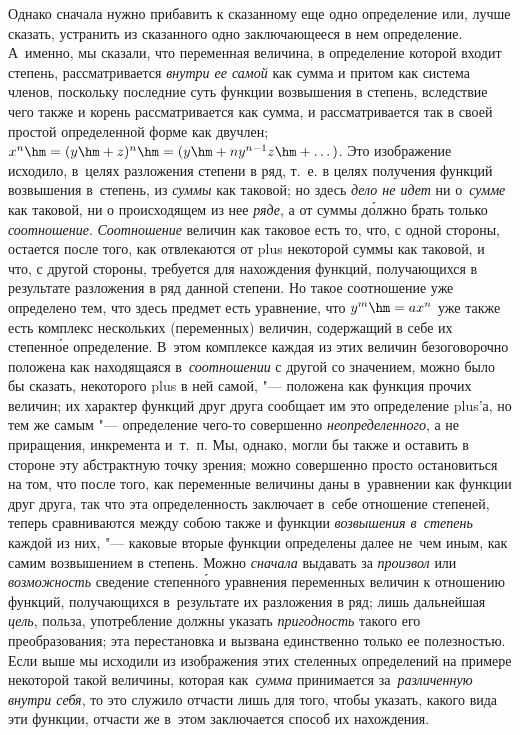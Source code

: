 Однако сначала нужно прибавить к сказанному еще одно определение или, лучше
сказать, устранить из сказанного одно заключающееся в нем определение.
А~именно, мы сказали, что переменная величина, в определение которой входит
степень, рассматривается {\em внутри ее самой} как сумма и притом как система
членов, поскольку последние суть функции возвышения в степень, вследствие чего
также и корень рассматривается как сумма, и рассматривается так в своей простой
определенной форме как двучлен;
$x^n\hm=(y\hm+z)^n\hm=(y\hm+ny^{n-1}z\hm+\dots)$. Это изображение исходило,
в~целях разложения степени в ряд, т.~е. в целях получения функций возвышения
в~степень, из {\em суммы} как таковой; но здесь {\em дело не идет} ни
о~{\em сумме} как таковой, ни о происходящем из нее {\em ряде}, а от суммы
д\'{о}лжно брать только {\em соотношение}. {\em Соотношение} величин как
таковое есть то, что, с одной стороны, остается после того, как отвлекаются от
plus некоторой суммы как таковой, и что, с другой стороны, требуется для
нахождения функций, получающихся в результате разложения в ряд данной степени.
Но такое соотношение уже определено тем, что здесь предмет есть уравнение, что
$y^m\hm=ax^n$ уже также есть комплекс нескольких (переменных) величин,
содержащий в себе их степенн\'{о}е определение. В~этом комплексе каждая из этих
величин безоговорочно положена как находящаяся в~{\em соотношении} с другой со
значением, можно было бы сказать, некоторого plus в ней самой, "--- положена
как функция прочих величин; их характер функций друг друга сообщает им это
определение plus'а, но тем же самым "--- определение чего-то совершенно
{\em неопределенного}, а не приращения, инкремента и~т.~п. Мы, однако, могли бы
также и оставить в стороне эту абстрактную точку зрения; можно совершенно
просто остановиться на том, что после того, как переменные величины даны
в~уравнении как функции друг друга, так что эта определенность заключает в~себе
отношение степеней, теперь сравниваются между собою также и функции
{\em возвышения в~степень} каждой из них, "--- каковые вторые функции
определены далее не~чем иным, как самим возвышением в степень. Можно
{\em сначала} выдавать за {\em произвол} или {\em возможность} сведение
степенн\'{о}го уравнения переменных величин к отношению функций, получающихся
в~результате их разложения в ряд; лишь дальнейшая {\em цель}, польза,
употребление должны указать {\em пригодность} такого его преобразования; эта
перестановка и вызвана единственно только ее полезностью. Если выше мы исходили
из изображения этих стеленных определений на примере некоторой такой величины,
которая как~{\em сумма} принимается за~{\em различенную внутри себя}, то это
служило отчасти лишь для того, чтобы указать, какого вида эти функции, отчасти
же в~этом заключается способ их нахождения.


